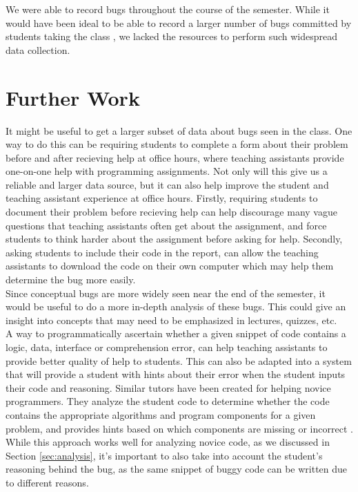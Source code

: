 \documentclass{sig-alternate}
\begin{document}
We were able to record \numtotal bugs throughout the course of the semester. While it would have been ideal to be able to record a larger number of bugs committed by students taking the class \cite{BryceCooleyHansenHayrapetyan10}, we lacked the resources to perform such widespread data collection.

\section{Further Work}
It might be useful to get a larger subset of data about bugs seen in the class. One way to do this can be requiring students to complete a form about their problem before and after recieving help at office hours, where teaching assistants provide one-on-one help with programming assignments. Not only will this give us a reliable and larger data source, but it can also help improve the student and teaching assistant experience at office hours. Firstly, requiring students to document their problem before recieving help can help discourage many vague questions that teaching assistants often get about the assignment, and force students to think harder about the assignment before asking for help. Secondly, asking students to include their code in the report, can allow the teaching assistants to download the code on their own computer which may help them determine the bug more easily.\\

Since conceptual bugs are more widely seen near the end of the semester, it would be useful to do a more in-depth analysis of these bugs. This could give an insight into concepts that may need to be emphasized in lectures, quizzes, etc.\\

A way to programmatically ascertain whether a given snippet of code contains a logic, data, interface or comprehension error, can help teaching assistants to provide better quality of help to students. This can also be adapted into a system that will provide a student with hints about their error when the student inputs their code and reasoning. Similar tutors have been created for helping novice programmers. They analyze the student code to determine whether the code contains the appropriate algorithms and program components for a given problem, and provides hints based on which components are missing or incorrect \cite{Sudol-DeLyser14}. While this approach works well for analyzing novice code, as we discussed in Section \ref{sec:analysis}, it's important to also take into account the student's reasoning behind the bug, as the same snippet of buggy code can be written due to different reasons.\\
\end{document}

